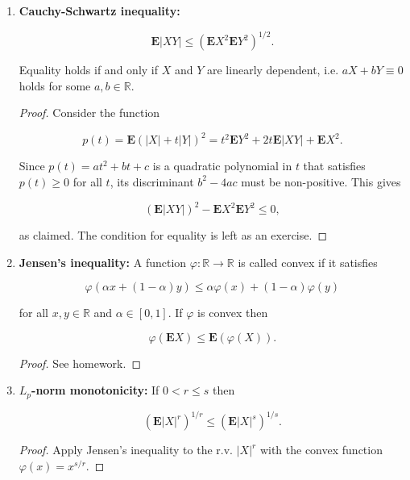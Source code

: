 \documentclass[11pt]{report}
\newcommand{\R}{\mathbb{R}}
\theoremstyle{plain}
\theoremstyle{definition}
\begin{document}
\begin{enumerate}[label=\arabic*.]
\[
\mathrm{P} ( | X-\mathbf{E} X| \ge t) \le \frac{\mathbf{V}(X)}{t^2}.
\]

\begin{proof}
Apply Markov's inequality to $Y=(X-\mathbf{E} X)^2$.
\end{proof}

\item \textbf{Cauchy-Schwartz inequality:}

\[
\mathbf{E}|XY| \le \left(\mathbf{E} X^2 \mathbf{E} Y^2\right)^{1/2}.
\]

\noindent Equality holds if and only if $X$ and $Y$ are
linearly dependent, i.e. $aX+bY\equiv 0$ holds for
some $a,b\in \R$.

\begin{proof}
Consider the function

\[
p(t) = \mathbf{E}(|X| + t |Y|)^2 = t^2 \mathbf{E} Y^2 + 2t \mathbf{E}|XY| + \mathbf{E} X^2.
\]

\noindent Since $p(t)=at^2+bt+c$ is a quadratic polynomial in
$t$ that satisfies $p(t)\ge 0$ for all $t$, its
discriminant $b^2-4ac$ must be non-positive. This
gives

\[
(\mathbf{E}|XY|)^2 - \mathbf{E} X^2 \mathbf{E} Y^2 \le 0,
\]

\noindent as claimed. The condition for equality is left as an
exercise.
\end{proof}

\item \textbf{Jensen's inequality:} A function $\varphi:\R\to\R$
is called convex if it satisfies

\[
\varphi(\alpha x + (1-\alpha)y) \le \alpha \varphi(x)+(1-\alpha)\varphi(y)
\]

\noindent for all $x,y\in\R$ and $\alpha\in [0,1]$. If $\varphi$
is convex then

\[
\varphi(\mathbf{E} X) \le \mathbf{E} (\varphi(X)).
\]

\begin{proof}
See homework.
\end{proof}

\item \textbf{$L_p$-norm monotonicity:} If $0<r\le s$ then

\begin{equation*} \tag{6}\label{eq:lpnormmono}
(\mathbf{E}|X|^r)^{1/r} \le (\mathbf{E} |X|^s)^{1/s}.
\end{equation*}

\begin{proof}
Apply Jensen's inequality to the r.v. $|X|^r$ with
the convex function $\varphi(x) = x^{s/r}$.
\end{proof}
\end{enumerate}
\end{document}

